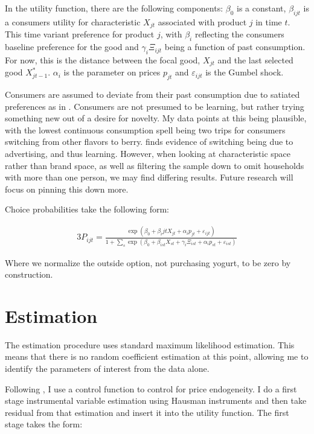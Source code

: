 \documentclass[11pt]{article}
\theoremstyle{definition}
\theoremstyle{remark}
\begin{document}
    In the utility function, there are the following components: $\beta_0$ is a constant, $\beta_{ijt}$ is a consumers utility for characteristic $X_{jt}$ associated with product $j$ in time $t$. This time variant preference for product $j$, with $\beta_i$ reflecting the consumers baseline preference for the good and $\gamma_i\Xi_{ijt}$ being a function of past consumption. For now, this is the distance between the focal good, $X_{jt}$ and the last selected good $X_{jt-1}^*$. $\alpha_i$ is the parameter on prices $p_{jt}$ and $\varepsilon_{ijt}$ is the Gumbel shock.

    Consumers are assumed to deviate from their past consumption due to satiated preferences as in \cite{mcalister_dynamic_2026}. Consumers are not presumed to be learning, but rather trying something new out of a desire for novelty. My data points at this being plausible, with the lowest continuous consumption spell being two trips for consumers switching from other flavors to berry. \cite{ackerberg_advertising_2003} finds evidence of switching being due to advertising, and thus learning. However, when looking at characteristic space rather than brand space, as well as filtering the sample down to omit households with more than one person, we may find differing results. Future research will focus on pinning this down more.

    Choice probabilities take the following form:

    \begin{alignat*}{3}
      P_{ijt} = \frac{\exp(\beta_0 + \beta_ijtX_{jt} + \alpha_ip_{jt} +  \varepsilon_{ijt})}{1 + \sum_s\exp(\beta_0+\beta_{ist}X_{st} + \gamma_i\Xi_{ist} + \alpha_ip_{st} + \varepsilon_{ist})}
    \end{alignat*}

    Where we normalize the outside option, not purchasing yogurt, to be zero by construction. 

\section{Estimation}

The estimation procedure uses standard maximum likelihood estimation. This means that there is no random coefficient estimation at this point, allowing me to identify the parameters of interest from the data alone.

Following \citet{petrin_control_2010}, I use a control function to control for price endogeneity. I do a first stage instrumental variable estimation using Hausman instruments and then take residual from that estimation and insert it into the utility function. The first stage takes the form:
\end{document}
